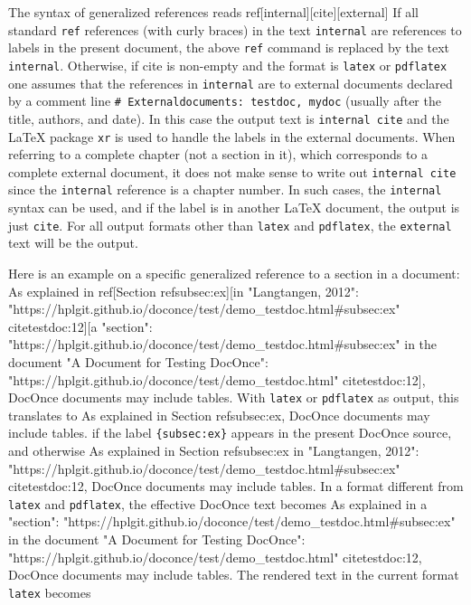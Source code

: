 \documentclass[%
oneside,                 %
final,                   %
chapterprefix=true,      %
open=right,              %
10pt]{book}
\begin{document}
The syntax of generalized references reads
\bccq
ref[internal][cite][external]
\eccq
If all standard \texttt{ref} references (with curly braces)
in the text \texttt{internal} are references
to labels in the present document, the above \texttt{ref} command is replaced
by the text \texttt{internal}. Otherwise, if cite is non-empty and the format
is \texttt{latex} or \texttt{pdflatex} one assumes that the references in \texttt{internal}
are to external documents declared by a comment line \Verb!# Externaldocuments: testdoc, mydoc! (usually after the title, authors,
and date). In this case the output text is \texttt{internal cite} and the
{\LaTeX} package \texttt{xr} is used to handle the labels in the external documents.
When referring to a complete chapter (not a section in it), which
corresponds to a complete external document, it does not make sense
to write out \texttt{internal cite} since the \texttt{internal} reference is a
chapter number. In such cases, the \texttt{internal} syntax can be used,
and if the label is in another {\LaTeX} document, the output is just \texttt{cite}.
For all
output formats other than \texttt{latex} and \texttt{pdflatex}, the \texttt{external}
text will be the output.

Here is an example on a specific generalized reference to a section
in a document:
\bccq
As explained in
ref[Section ref{subsec:ex}][in "Langtangen, 2012":
"https://hplgit.github.io/doconce/test/demo_testdoc.html#subsec:ex"
cite{testdoc:12}][a "section":
"https://hplgit.github.io/doconce/test/demo_testdoc.html#subsec:ex" in
the document "A Document for Testing DocOnce":
"https://hplgit.github.io/doconce/test/demo_testdoc.html"
cite{testdoc:12}], DocOnce documents may include tables.
\eccq
With \texttt{latex} or \texttt{pdflatex} as output, this translates to
\bccq
As explained in
Section ref{subsec:ex}, DocOnce documents may include tables.
\eccq
if the label \Verb!{subsec:ex}! appears in the present DocOnce source, and
otherwise
\bccq
As explained in
Section ref{subsec:ex} in "Langtangen, 2012":
"https://hplgit.github.io/doconce/test/demo_testdoc.html#subsec:ex"
cite{testdoc:12}, DocOnce documents may include tables.
\eccq
In a format different from \texttt{latex} and \texttt{pdflatex}, the effective DocOnce
text becomes
\bccq
As explained in
a "section":
"https://hplgit.github.io/doconce/test/demo_testdoc.html#subsec:ex" in
the document "A Document for Testing DocOnce":
"https://hplgit.github.io/doconce/test/demo_testdoc.html"
cite{testdoc:12}, DocOnce documents may include tables.
\eccq
The rendered text in the current format \texttt{latex} becomes
\end{document}
